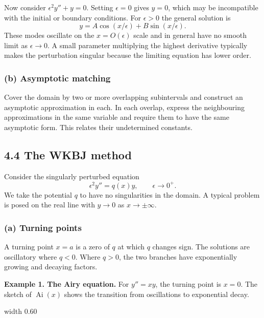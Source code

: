 \documentclass[11pt,a4paper]{article}
\begin{document}
Now consider $\epsilon^2 y''+y=0$. Setting $\epsilon=0$ gives $y=0$,
which may be incompatible with the initial or boundary conditions.
For $\epsilon>0$ the general solution is
\[
    y=A\cos(x/\epsilon)+B\sin(x/\epsilon).
\]
These modes oscillate on the $x=O(\epsilon)$ scale and in general
have no smooth limit as $\epsilon\to0$. A small parameter multiplying
the highest derivative typically makes the perturbation singular
because the limiting equation has lower order.

\subsubsection*{(b) Asymptotic matching}

Cover the domain by two or more overlapping subintervals and
construct an asymptotic approximation in each. In each overlap,
express the neighbouring approximations in the same variable and
require them to have the same asymptotic form. This relates their
undetermined constants.

\subsection*{4.4 The WKBJ method}

Consider the singularly perturbed equation
\begin{equation}
    \epsilon^2y''=q(x)y,\qquad \epsilon\to0^+.
    \tag{$+$}
\end{equation}
We take the potential $q$ to have no singularities in the domain.
A typical problem is posed on the real line with $y\to0$ as
$x\to\pm\infty$.

\subsubsection*{(a) Turning points}

A turning point $x=a$ is a zero of $q$ at which $q$ changes sign.
The solutions are oscillatory where $q<0$. Where $q>0$, the
two branches have exponentially growing and decaying factors.

\medskip
\noindent\textbf{Example 1. The Airy equation.}
For $y''=xy$, the turning point is $x=0$. The sketch of
$\operatorname{Ai}(x)$ shows the transition from oscillations
to exponential decay.
\begin{center}
    \pdfximage width 0.60\linewidth {figures/asymptotic-lecture13/airy-turning-point.png}
    \leavevmode\pdfrefximage\pdflastximage
\end{center}
\end{document}
